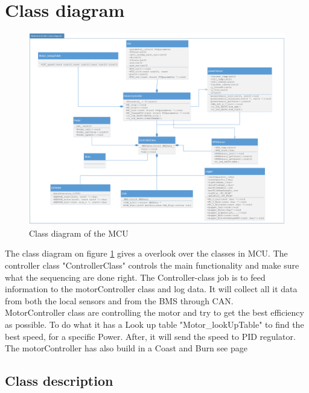 \newpage
\section{Class diagram}
\label{sec:class_diagram}

\begin{figure}[H]
	\centering
	\includegraphics [width=6in]{Software/Pictures/class-diagram.png}
	\caption{Class diagram of the MCU}
	\label{fig:Class_diagram_MCU}
\end{figure}

The class diagram on figure \ref{fig:Class_diagram_MCU} gives a overlook over the classes in MCU. The controller class "ControllerClass" controls the main functionality and make sure what the sequencing are done right. The Controller-class job is to feed information to the motorController class and log data. It will collect all it data from both the local sensors and from the BMS through CAN.\\
MotorController class are controlling the motor and try to get the best efficiency as possible. To do what it has a Look up table "Motor\_lookUpTable" to find the best speed, for a specific Power. After, it will send the speed to PID regulator. The motorController has also build in a Coast and Burn see page \pageref{sec:Coast_and_Burn}\\

\subsection{Class description}

